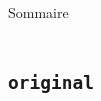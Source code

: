 \documentclass[9pt]{beamer}
\begin{document}
\begin{frame}{Sommaire}
	\begin{columns}[onlytextwidth,T]
        \begin{column}{.45\textwidth}
            \tableofcontents[currentsection, sections=1-2]
        \end{column}
        \begin{column}{.45\textwidth}
            \tableofcontents[currentsection, sections=3-5]
        \end{column}
    \end{columns}
\end{frame}



\subsection{\texttt{original}}
\end{document}
